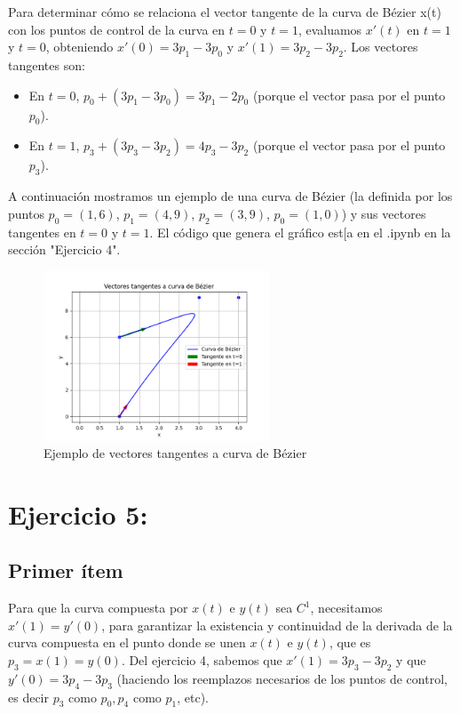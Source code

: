 \documentclass{article}
\begin{document}
Para determinar cómo se relaciona el vector tangente de la curva de Bézier x(t) con los puntos de control de la curva en $t=0$ y $t=1$, evaluamos $x'(t)$ en $t = 1$ y $t = 0$, obteniendo $x'(0) = 3p_1-3p_0$ y $x'(1) = 3p_2-3p_2$. Los vectores tangentes son:
\begin{itemize}
    \item En $t = 0$, $p_0 + (3p_1-3p_0) = 3p_1-2p_0$ (porque el vector pasa por el punto $p_0$).
    \item En $t = 1$, $p_3 +  (3p_3-3p_2) =  4p_3-3p_2$ (porque el vector pasa por el punto $p_3$).
\end{itemize}

A continuación mostramos un ejemplo de una curva de Bézier (la definida por los puntos $p_0 = (1, 6)$, $p_1 = (4, 9)$, $p_2 = (3, 9)$, $p_0 = (1, 0)$) y sus vectores tangentes en $t = 0$ y $t = 1$. El código que genera el gráfico est[a en el .ipynb en la sección "Ejercicio 4".

\begin{figure}[H]
    \centering
    \includegraphics[width=0.6\textwidth]{imagenes/ej4.png}
    \caption{Ejemplo de vectores tangentes a curva de Bézier}
    \label{fig:ejemplo}
\end{figure}

\section*{Ejercicio 5:}
\subsection*{Primer ítem}
Para que la curva compuesta por $x(t)$ e $y(t)$ sea $C^1$, necesitamos $x'(1) = y'(0)$, para garantizar la existencia y continuidad de la derivada de la curva compuesta en el punto donde se unen $x(t)$ e $y(t)$, que es $p_3 = x(1) = y(0)$. Del ejercicio 4, sabemos que $x'(1) = 3p_3-3p_2$ y que $y'(0) = 3p_4-3p_3$ (haciendo los reemplazos necesarios de los puntos de control, es decir $p_3$ como $p_0, p_4$ como $p_1$, etc).
\end{document}
